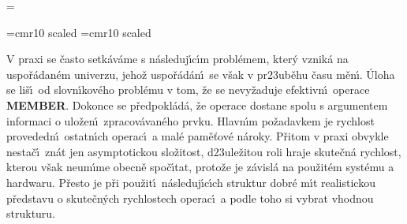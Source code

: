 
\magnification=
\pagewidth{5.5in}
\pageheight{20cm}



\font\bigbigrm=cmr10 scaled 
\font\bigbigbigrm=cmr10 scaled 
\def \emph#1{\underbar{#1}}
\def \Prob{\operatorname{Prob}}
\def \count{\operatorname{count}}
\def \NIL{\operatorname{NIL}}
\def \otec{\operatorname{otec}}
\def \list{\operatorname{list}}
\def \Prv{\operatorname{Prv}}
\def \Nasl{\operatorname{Nasl}}
\def \levy{\operatorname{levy}}
\def \pravy{\operatorname{pravy}}
\def \key{\operatorname{key}}
\def \Prst{\operatorname{Prst}}
\def \hloubka{\operatorname{hloubka}}
\def \bratr{\operatorname{bratr}}
\def \npl{\operatorname{npl}}
\def \Cont{\operatorname{Cont}}

\centerline{}
\bigskip
\centerline{}
\bigskip

\flushpar V praxi se \v casto setk\'av\'ame s n\'asleduj\'\i c\'\i m 
probl\'emem, kter\'y vznik\'a na uspo\v r\'adan\'em univerzu, jeho\v z 
uspo\v r\'ad\'an\'\i\ se v\v sak v pr\accent23ub\v ehu \v casu m\v en\'\i . \'Uloha se 
li\v s\'\i\ od slovn\'\i kov\'eho probl\'emu v tom, \v ze se nevy\v zaduje  
efektivn\'\i\ operace {\bf MEMBER}. Dokonce se p\v redpokl\'ad\'a, \v ze ope\-race 
dostane spolu s argumentem informaci o ulo\v zen\'\i\ 
zpracov\'avan\'eho prvku. 
Hlav\-n\'\i m po\v zadavkem je rychlost provededn\'\i\ ostatn\'\i ch operac\'\i\ a mal\'e 
pam\v e\v tov\'e n\'aroky. P\v ritom v praxi obvykle nesta\v c\'\i\ zn\'at jen 
asymptotickou slo\v zitost, d\accent23ule\v zitou roli hraje skute\v cn\'a 
rychlost, kterou v\v sak neum\'\i me obecn\v e spo\v c\'\i tat, proto\v ze je z\'avisl\'a na 
pou\v zit\'em syst\'emu a hardwaru. P\v resto je p\v ri pou\v zit\'\i\ 
n\'asleduj\'\i c\'\i ch struktur dobr\'e m\'\i t realistickou p\v redstavu o 
skute\v cn\'ych rychlostech operac\'\i\ a podle toho si vybrat 
vhodnou strukturu. 
\medskip

